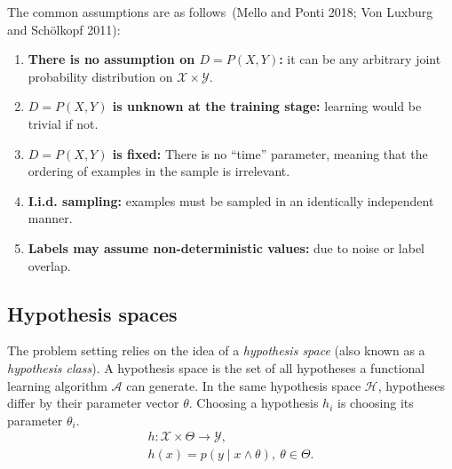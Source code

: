 \documentclass[
  letterpaper,
  12pt,
  british]{tufte-book}
\theoremstyle{plain}
\theoremstyle{definition}
\theoremstyle{plain}
\theoremstyle{remark}
\begin{document}
The common assumptions are as follows~(Mello and Ponti 2018; Von Luxburg
and Schölkopf
2011):

\begin{enumerate}
\def\labelenumi{\roman{enumi}.}
\item
  \textbf{There is no assumption on \(D=P(\mathit{X},\mathit{Y})\):} it
  can be any arbitrary joint probability distribution on
  \(\mathcal{X}\times \mathcal{Y}\).\protect\hypertarget{distribution-free}{}{}
\item
  \textbf{\(D=P(\mathit{X},\mathit{Y})\) is unknown at the training
  stage:} learning would be trivial if not.
\item
  \textbf{\(D=P(\mathit{X},\mathit{Y})\) is fixed:} There is no ``time''
  parameter, meaning that the ordering of examples in the sample is
  irrelevant\protect\hypertarget{no-time}{}{}.
\item
  \textbf{I.i.d. sampling:} examples must be sampled in an identically
  independent manner.\protect\hypertarget{independent_sampling}{}{}
\item
  \textbf{Labels may assume non-deterministic values:} due to noise or
  label overlap.
\end{enumerate}

\hypertarget{sec-hypothesis_space}{%
\subsection{Hypothesis spaces}\label{sec-hypothesis_space}}

The problem setting relies on the idea of a \emph{hypothesis space}
(also known as a \emph{hypothesis class}). A hypothesis space is the set
of all hypotheses a functional learning algorithm
\(\mathcal{A}\) can generate. In the same hypothesis space
\(\mathcal{H}\), hypotheses differ by their parameter vector \(\theta\).
Choosing a hypothesis \(h_i\) is choosing its parameter \(\theta_i\).
\begin{align}
    h: \mathcal{X}\times \Theta \to \mathcal{Y}, \\
    h(\mathit{x}) = p(\mathit{y}\mid \mathit{x}\land \theta),~ \theta \in \Theta.
\end{align}
\end{document}
